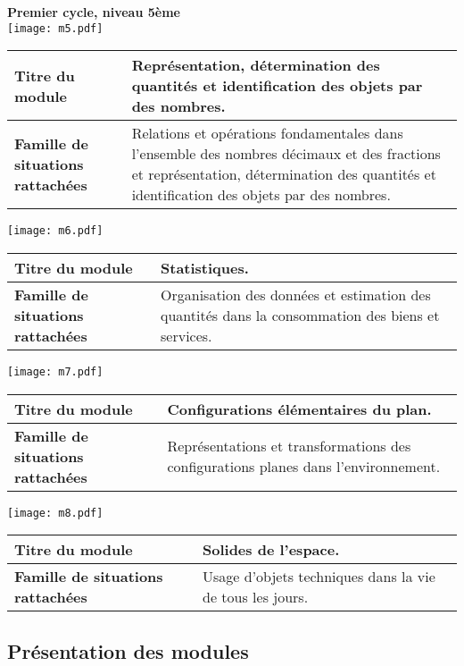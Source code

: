 \textbf{Premier cycle, niveau 5ème}\\

\texttt{[image: m5.pdf]} 

\begin{tabular}{>{\raggedleft\arraybackslash}p{4cm}p{9cm}}
\textbf{Titre du module} & Représentation, détermination des quantités et identification des objets par des nombres.\\\midrule
\textbf{Famille de situations rattachées} & Relations et opérations fondamentales dans l'ensemble des nombres décimaux et des fractions et représentation, détermination des quantités et identification des objets par des nombres.
\end{tabular}

\texttt{[image: m6.pdf]} 

\begin{tabular}{>{\raggedleft\arraybackslash}p{4cm}p{9cm}}
\textbf{Titre du module} &Statistiques.\\\midrule
\textbf{Famille de situations rattachées} &Organisation des données et estimation des quantités dans la consommation des biens et services.
\end{tabular}

\texttt{[image: m7.pdf]} 

\begin{tabular}{>{\raggedleft\arraybackslash}p{4cm}p{9cm}}
\textbf{Titre du module} & Configurations élémentaires du plan.\\\midrule
\textbf{Famille de situations rattachées} & Représentations et transformations des configurations planes dans l'environnement.
\end{tabular}

\texttt{[image: m8.pdf]} 

\begin{tabular}{>{\raggedleft\arraybackslash}p{4cm}p{9cm}}
\textbf{Titre du module} & Solides de l'espace.\\\midrule
\textbf{Famille de situations rattachées} & Usage d'objets techniques dans la vie de tous les jours.
\end{tabular}

\subsection*{Présentation des modules}

